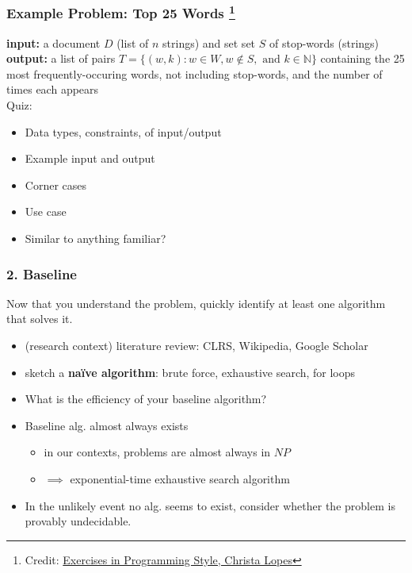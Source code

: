 \documentclass{beamer}
\begin{document}
\begin{frame} \frametitle{Example Problem: Top 25 Words \footnote{Credit: \href{https://www.crcpress.com/Exercises-in-Programming-Style/Lopes/p/book/9781482227376}{Exercises in Programming Style, Christa Lopes}}}
\textbf{input:} a document $D$ (list of $n$ strings) and set
  set $S$ of stop-words (strings) \\
\textbf{output:} a list of pairs
  $T=\{(w, k) : w \in W, w \notin S, \text{ and } k \in \mathbb{N} \}$
  containing the 25 most frequently-occuring words, not including stop-words,
  and the number of times each appears \\
\vspace{12pt}
  Quiz:
  \begin{itemize}
    \item Data types, constraints, of input/output
    \item Example input and output
    \item Corner cases
    \item Use case
    \item Similar to anything familiar?
  \end{itemize}

\end{frame}

\begin{frame} \frametitle{2. Baseline}
Now that you understand the problem, quickly identify at least one algorithm
that solves it.
\begin{itemize}
  \item (research context) literature review: CLRS, Wikipedia, Google Scholar
  \item sketch a \textbf{na\"{i}ve algorithm}: brute force, exhaustive search,
    for loops
  \item What is the efficiency of your baseline algorithm?
  \item Baseline alg. almost always exists
    \begin{itemize}
      \item in our contexts, problems are almost always in $NP$
      \item $\implies$ exponential-time exhaustive search algorithm
    \end{itemize}
  \item In the unlikely event no alg. seems to exist, consider whether the
    problem is provably undecidable.
\end{itemize}
\end{frame}
\end{document}

